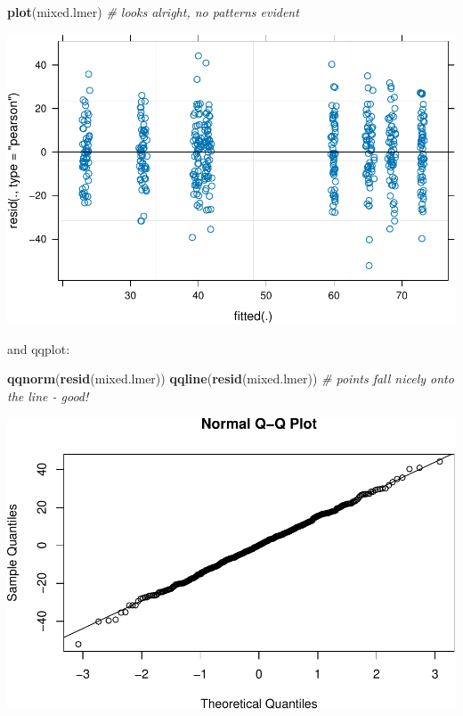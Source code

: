 \documentclass[
]{article}
\newenvironment{Shaded}{\begin{snugshade}}{\end{snugshade}}
\newcommand{\CommentTok}[1]{\textcolor[rgb]{0.56,0.35,0.01}{\textit{#1}}}
\newcommand{\FunctionTok}[1]{\textcolor[rgb]{0.13,0.29,0.53}{\textbf{#1}}}
\newcommand{\NormalTok}[1]{#1}
\begin{document}
\begin{Shaded}
\begin{Highlighting}[]
\FunctionTok{plot}\NormalTok{(mixed.lmer)   }\CommentTok{\# looks alright, no patterns evident}
\end{Highlighting}
\end{Shaded}

\includegraphics{Introduction-to-linear-mixed-models_files/figure-latex/unnamed-chunk-14-1.pdf}

and qqplot:

\begin{Shaded}
\begin{Highlighting}[]
\FunctionTok{qqnorm}\NormalTok{(}\FunctionTok{resid}\NormalTok{(mixed.lmer))}
\FunctionTok{qqline}\NormalTok{(}\FunctionTok{resid}\NormalTok{(mixed.lmer))   }\CommentTok{\# points fall nicely onto the line {-} good!}
\end{Highlighting}
\end{Shaded}

\includegraphics{Introduction-to-linear-mixed-models_files/figure-latex/unnamed-chunk-15-1.pdf}
\end{document}
